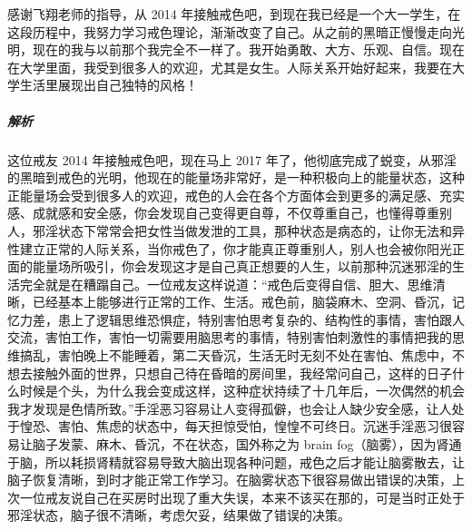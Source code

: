 \begin{case}
    感谢飞翔老师的指导，从 2014 年接触戒色吧，到现在我已经是一个大一学生，在这段历程中，我努力学习戒色理论，渐渐改变了自己。从之前的黑暗正慢慢走向光明，现在的我与以前那个我完全不一样了。我开始勇敢、大方、乐观、自信。现在在大学里面，我受到很多人的欢迎，尤其是女生。人际关系开始好起来，我要在大学生活里展现出自己独特的风格！
    \subparagraph{解析} 这位戒友 2014 年接触戒色吧，现在马上 2017 年了，他彻底完成了蜕变，从邪淫的黑暗到戒色的光明，他现在的能量场非常好，是一种积极向上的能量状态，这种正能量场会受到很多人的欢迎，戒色的人会在各个方面体会到更多的满足感、充实感、成就感和安全感，你会发现自己变得更自尊，不仅尊重自己，也懂得尊重别人，邪淫状态下常常会把女性当做发泄的工具，那种状态是病态的，让你无法和异性建立正常的人际关系，当你戒色了，你才能真正尊重别人，别人也会被你阳光正面的能量场所吸引，你会发现这才是自己真正想要的人生，以前那种沉迷邪淫的生活完全就是在糟蹋自己。一位戒友这样说道：“戒色后变得自信、胆大、思维清晰，已经基本上能够进行正常的工作、生活。戒色前，脑袋麻木、空洞、昏沉，记忆力差，患上了逻辑思维恐惧症，特别害怕思考复杂的、结构性的事情，害怕跟人交流，害怕工作，害怕一切需要用脑思考的事情，特别害怕刺激性的事情把我的思维搞乱，害怕晚上不能睡着，第二天昏沉，生活无时无刻不处在害怕、焦虑中，不想去接触外面的世界，只想自己待在昏暗的房间里，我经常问自己，这样的日子什么时候是个头，为什么我会变成这样，这种症状持续了十几年后，一次偶然的机会我才发现是色情所致。”手淫恶习容易让人变得孤僻，也会让人缺少安全感，让人处于惶恐、害怕、焦虑的状态中，每天担惊受怕，惶惶不可终日。沉迷手淫恶习很容易让脑子发蒙、麻木、昏沉，不在状态，国外称之为 brain fog（脑雾），因为肾通于脑，所以耗损肾精就容易导致大脑出现各种问题，戒色之后才能让脑雾散去，让脑子恢复清晰，到时才能正常工作学习。在脑雾状态下很容易做出错误的决策，上次一位戒友说自己在买房时出现了重大失误，本来不该买在那的，可是当时正处于邪淫状态，脑子很不清晰，考虑欠妥，结果做了错误的决策。
\end{case}

